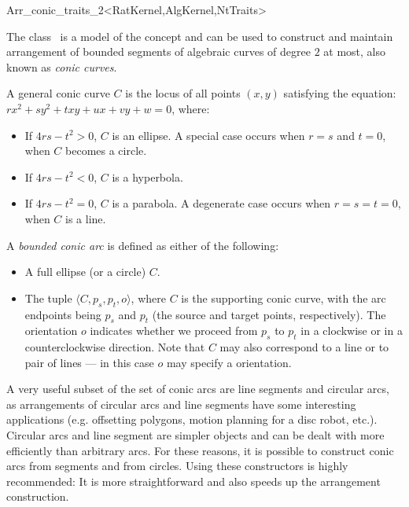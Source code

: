 
\ccRefPageBegin
\begin{ccRefClass}{Arr_conic_traits_2<RatKernel,AlgKernel,NtTraits>}

\ccDefinition

The class \ccRefName\ is a model of the  concept
and can be used to construct and maintain arrangement of bounded segments of
algebraic curves of degree $2$ at most, also known as {\sl conic curves}.

A general conic curve $C$ is the locus of all points $(x,y)$ satisfying the
equation: $r x^2 + s y^2 + t x y + u x + v y + w = 0$, where: 
\begin{itemize}
\item If $4 r s - t^2 > 0$, $C$ is an ellipse.
      A special case occurs when $r = s$ and $t = 0$, when $C$
      becomes a circle. 
\item If $4 r s - t^2 < 0$, $C$ is a hyperbola. 
\item If $4 r s - t^2 = 0$, $C$ is a parabola.
      A degenerate case occurs when $r = s = t = 0$, when $C$ is a line.
\end{itemize}

A {\sl bounded conic arc} is defined as either of the following: 
\begin{itemize}
\item A full ellipse (or a circle) $C$. 
\item The tuple $\langle C, p_s, p_t, o \rangle$, where $C$ is the supporting
      conic curve, with the arc endpoints being $p_s$ and $p_t$ 
      (the source and target points, respectively). The orientation $o$  
      indicates whether we proceed from $p_s$ to $p_t$ in a clockwise or in a
      counterclockwise direction. Note that $C$ may also
      correspond to a line or to pair of lines --- in this case $o$ may
      specify a  orientation.
\end{itemize}

A very useful subset of the set of conic arcs are line segments and circular
arcs, as arrangements of circular arcs and line segments have some
interesting applications (e.g. offsetting polygons, motion planning for a
disc robot, etc.). Circular arcs and line segment are simpler objects and can
be dealt with more efficiently than arbitrary arcs. For these reasons, it is
possible to construct conic arcs from segments and from circles. Using these
constructors is highly recommended: It is more straightforward and also speeds 
up the arrangement  construction.


\end{ccRefClass}
